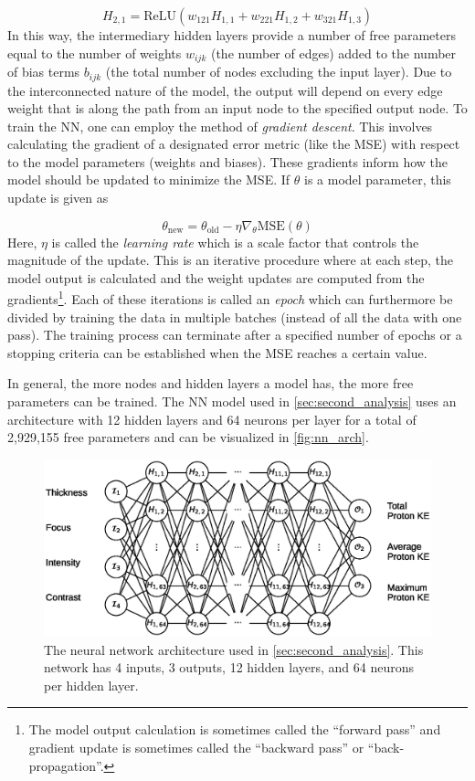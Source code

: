 \begin{equation}
	H_{2,1} = \text{ReLU}(w_{121} H_{1,1} + w_{221} H_{1,2} +w_{321} H_{1,3})
\end{equation}
In this way, the intermediary hidden layers provide a number of free parameters equal to the number of weights $w_{ijk}$ (the number of edges) added to the number of bias terms $b_{ijk}$ (the total number of nodes excluding the input layer). Due to the interconnected nature of the model, the output will depend on every edge weight that is along the path from an input node to the specified output node. To train the \gls{NN}, one can employ the method of \emph{gradient descent}. This involves calculating the gradient of a designated error metric (like the \gls{MSE}) with respect to the model parameters (weights and biases). These gradients inform how the model should be updated to minimize the \gls{MSE}. If $\theta$ is a model parameter, this update is given as 

\begin{equation}
	\theta_\text{new} = \theta_\text{old} - \eta \nabla_\theta \text{MSE}(\theta) \label{eq:gradient_descent}
\end{equation}
Here, $\eta$ is called the \emph{learning rate} which is a scale factor that controls the magnitude of the update. This is an iterative procedure where at each step, the model output is calculated and the weight updates are computed from the gradients\footnote{The model output calculation is sometimes called the ``forward pass'' and gradient update is sometimes called the ``backward pass'' or ``back-propagation''.}. Each of these iterations is called an \emph{epoch} which can furthermore be divided by training the data in multiple batches (instead of all the data with one pass). The training process can terminate after a specified number of epochs or a stopping criteria can be established when the \gls{MSE} reaches a certain value.

In general, the more nodes and hidden layers a model has, the more free parameters can be trained. The \gls{NN} model used in \autoref{sec:second_analysis} uses an architecture with 12 hidden layers and 64 neurons per layer for a total of 2,929,155 free parameters and can be visualized in \autoref{fig:nn_arch}.

\begin{figure}
	\centering 
	\includegraphics[width=0.95\linewidth]{planning/images/nn_architecture2.eps}
	\caption{The neural network architecture used in \autoref{sec:second_analysis}. This network has 4 inputs, 3 outputs, 12 hidden layers, and 64 neurons per hidden layer.}
	\label{fig:nn_arch}
\end{figure}
